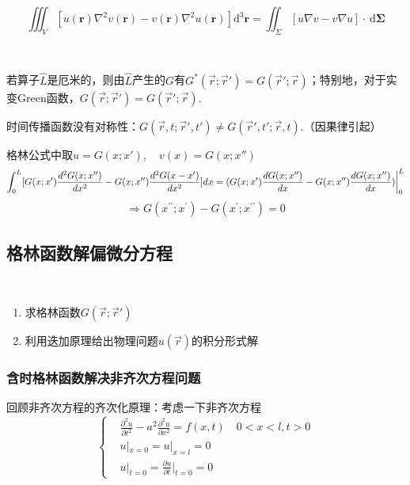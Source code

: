 \begin{dfn}[Green公式三维形式]
    $$\boxed{\iiint_V\left[u(\boldsymbol{r})\nabla^2v(\boldsymbol{r})-v(\boldsymbol{r})\nabla^2u(\boldsymbol{r})\right]\mathrm{d}^3\boldsymbol{r}=\iint_\Sigma\left[u\nabla v-v\nabla u\right]\cdot\mathrm{~d}\boldsymbol{\Sigma}}$$
    \end{dfn}
\begin{thm}[Green函数的对称性]$\ $

若算子$\hat{L}$是厄米的，则由$\hat{L}$产生的$G$有$G^*(\vec{r};\vec{r}')=G(\vec{r}';\vec{r})$；特别地，对于实变Green函数，$G(\vec{r};\vec{r}')=G(\vec{r}';\vec{r})$. 

时间传播函数没有对称性：$G(\vec{r},t;\vec{r}',t')\ne G(\vec{r}',t';\vec{r},t)$.（因果律引起）
\end{thm}
\begin{prf}[对于泊松方程：$\hat{L}=\nabla^2$]
格林公式中取$u=G(x;x'),\quad v(x)=G(x;x'')$
$$\int_{0}^{L}[G(x;x^{\prime})\frac{d^{2}G(x;x^{\prime\prime})}{dx^{2}}-G(x;x^{\prime\prime})\frac{d^{2}G(x-x^{\prime})}{dx^2}]dx\\
=(G(x;x^{\prime})\frac{dG(x;x^{\prime\prime})}{dx}-G(x;x^{\prime\prime})\frac{dG(x;x^{\prime\prime})}{dx})\bigg|_{0}^{L}$$
$$\Rightarrow G(x^{\prime\prime};x^{\prime})-G(x^{\prime};x^{\prime\prime})=0$$
\end{prf}






\subsection{格林函数解偏微分方程}
\begin{mtd}[偏微分方程的积分解]$\ $

    \begin{enumerate}
        \item 求格林函数$G(\vec{r};\vec{r}')$
        \item 利用迭加原理给出物理问题$u(\vec{r})$的积分形式解
    \end{enumerate}
    
\end{mtd}
\subsubsection{含时格林函数解决非齐次方程问题}
回顾非齐次方程的齐次化原理：考虑一下非齐次方程
$$\left\{
\begin{aligned}
&
\frac{\partial^2{u}}{\partial{t}^2}-a^2\frac{\partial^2{u}}{\partial{x}^2}=f(x,t)\quad 0<x<l,t>0\\
&u|_{x=0}=u|_{x=l}=0\\
&u|_{t=0}=\frac{\partial{u}}{\partial t}\bigg|_{t=0}=0
        \end{aligned}
\right.$$

